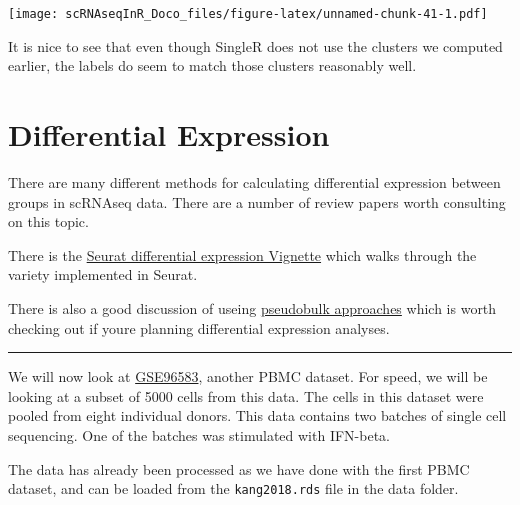 \documentclass[
]{book}
\begin{document}
\texttt{[image: scRNAseqInR\_Doco\_files/figure-latex/unnamed-chunk-41-1.pdf]}

It is nice to see that even though SingleR does not use the clusters we computed earlier, the labels do seem to match those clusters reasonably well.

\hypertarget{de2}{%
\chapter{Differential Expression}\label{de2}}

There are many different methods for calculating differential expression between groups in scRNAseq data. There are a number of review papers worth consulting on this topic.

There is the \href{https://satijalab.org/seurat/archive/v3.1/de_vignette.html}{Seurat differential expression Vignette} which walks through the variety implemented in Seurat.

There is also a good discussion of useing \href{http://bioconductor.org/books/3.15/OSCA.multisample/multi-sample-comparisons.html\#creating-pseudo-bulk-samples}{pseudobulk approaches} which is worth checking out if youre planning differential expression analyses.

\begin{center}\rule{0.5\linewidth}{0.5pt}\end{center}

We will now look at \href{https://www.ncbi.nlm.nih.gov/geo/query/acc.cgi?acc=GSE96583}{GSE96583}, another PBMC dataset. For speed, we will be looking at a subset of 5000 cells from this data. The cells in this dataset were pooled from eight individual donors. This data contains two batches of single cell sequencing. One of the batches was stimulated with IFN-beta.

The data has already been processed as we have done with the first PBMC dataset, and can be loaded from the \texttt{kang2018.rds} file in the data folder.
\end{document}
